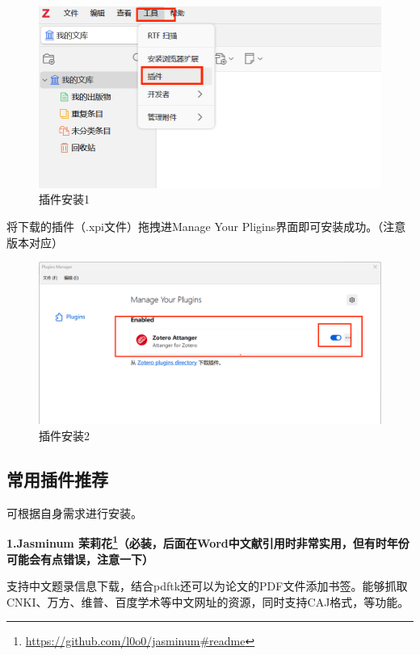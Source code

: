 \documentclass[]{ctexbook}
\renewcommand{\href}[2]{#2\footnote{\url{#1}}}
\theoremstyle{definition}
\theoremstyle{definition}
\theoremstyle{definition}
\theoremstyle{definition}
\theoremstyle{remark}
\begin{document}
\begin{figure}

{\centering \includegraphics[width=0.7\linewidth]{img/zotero/zotero_plugins_install_1} 

}

\caption{插件安装1}\label{fig:zotero-plugins-install-1}
\end{figure}

将下载的插件（.xpi文件）拖拽进Manage Your Pligins界面即可安装成功。（注意版本对应）

\begin{figure}

{\centering \includegraphics[width=0.7\linewidth]{img/zotero/zotero_plugins_install_2} 

}

\caption{插件安装2}\label{fig:zotero-plugins-install-2}
\end{figure}

\subsection{常用插件推荐}\label{ux5e38ux7528ux63d2ux4ef6ux63a8ux8350}

可根据自身需求进行安装。

\textbf{1.\href{https://github.com/l0o0/jasminum\#readme}{Jasminum 茉莉花}（必装，后面在Word中文献引用时非常实用，但有时年份可能会有点错误，注意一下）}

支持中文题录信息下载，结合pdftk还可以为论文的PDF文件添加书签。能够抓取CNKI、万方、维普、百度学术等中文网址的资源，同时支持CAJ格式，等功能。
\end{document}
